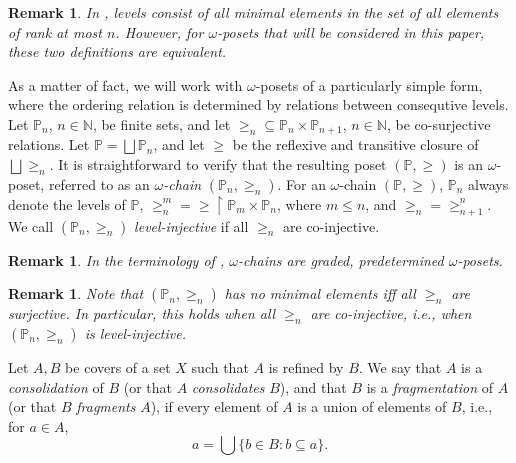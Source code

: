 \documentclass[12pt]{amsart}
\theoremstyle{plain}
\newtheorem{remark}[theorem]{\bf Remark}
\newcommand \uhr{\upharpoonright}
\newcommand \NN{\mathbb{N}}
\newcommand \PPb{\mathbb{P}}
\begin{document}
\begin{remark}
In \cite{BaBiVi}, levels consist of all minimal elements in the set of all elements of rank at most $n$. However, for $\omega$-posets that will be considered in this paper, these two definitions are equivalent.
\end{remark}


As a matter of fact, we will work with  $\omega$-posets of a particularly simple form, where the ordering relation is determined by relations between consequtive levels. Let $\PPb_n$, $n \in \NN$, be finite sets, and let $\geq_n \subseteq \PPb_n \times \PPb_{n+1}$, $n \in \NN$, be co-surjective relations. %
Let $\PPb=\bigsqcup \PPb_n$, and let $\geq$ be the reflexive and transitive closure of $\bigsqcup \geq_n$.  It is straightforward to verify that the resulting poset  $(\PPb,\geq)$ is an $\omega$-poset, referred to as an \emph{$\omega$-chain} $(\PPb_n, \geq_n)$. For an $\omega$-chain $(\PPb, \geq)$, $\PPb_n$ always denote the levels of $\PPb$, $\geq^m_n=\geq \uhr \PPb_m \times \PPb_{n}$, where $m \leq n$, and $\geq_n=\geq^n_{n+1}$. We call $(\PPb_n, \geq_n)$ \emph{level-injective} if all $\geq_n$ are co-injective.

\begin{remark}
	In the terminology of \cite{BaBiVi}, $\omega$-chains are graded, predetermined $\omega$-posets.  
\end{remark}

\begin{remark}
	Note that $(\PPb_n, \geq_n)$ has no minimal elements  iff all $\geq_n$ are  surjective. In particular, this holds  when all $\geq_n$ are co-injective, i.e.,   when $(\PPb_n, \geq_n)$  is level-injective.%
\end{remark}

Let $A, B$ be covers of a set $X$ such that $A$ is refined by $B$. We say that $A$ is a \emph{consolidation}  of $B$ (or that $A$ \emph{consolidates} $B$), and that $B$ is a \emph{fragmentation}  of $A$ (or that $B$ \emph{fragments} $A$),  if every element of $A$ is a union of elements of $B$, i.e., for $a \in A$,  $$a=\bigcup \{b \in B: b \subseteq a \}.$$  
 
\end{document}
